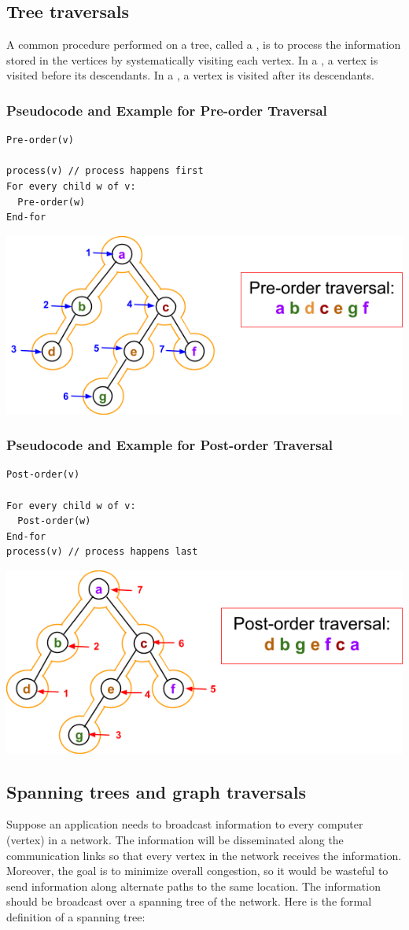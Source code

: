 \subsection{Tree traversals}
A common procedure performed on a tree, called a , is to process the information stored in the vertices by systematically visiting each vertex. In a , a vertex is visited before its descendants. In a , a vertex is visited after its descendants.

\subsubsection*{Pseudocode and Example for Pre-order Traversal}
\begin{lstlisting}
Pre-order(v)

process(v) // process happens first
For every child w of v:
  Pre-order(w)
End-for
\end{lstlisting}
\begin{center}
  \includegraphics[width=0.4\linewidth]{resources/preorder traversal.png}
\end{center}

\subsubsection*{Pseudocode and Example for Post-order Traversal}
\begin{lstlisting}
Post-order(v)

For every child w of v:
  Post-order(w)
End-for
process(v) // process happens last
\end{lstlisting}
\begin{center}
  \includegraphics[width=0.4\linewidth]{resources/post order traversal.png}
\end{center}

\subsection{Spanning trees and graph traversals}
Suppose an application needs to broadcast information to every computer (vertex) in a network. The information will be disseminated along the communication links so that every vertex in the network receives the information. Moreover, the goal is to minimize overall congestion, so it would be wasteful to send information along alternate paths to the same location. The information should be broadcast over a spanning tree of the network. Here is the formal definition of a spanning tree:

